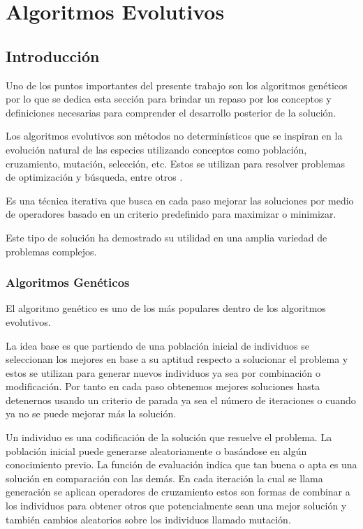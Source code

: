 
\chapter{Algoritmos Evolutivos}

\section{Introducción}

Uno de los puntos importantes del presente trabajo son los algoritmos genéticos por lo que se dedica esta sección para  brindar un repaso por los conceptos y definiciones necesarias para comprender el desarrollo posterior de la solución.

Los algoritmos evolutivos son métodos no determinísticos que se inspiran en la evolución natural de las especies utilizando conceptos como población, cruzamiento, mutación, selección, etc. Estos se utilizan para resolver problemas de optimización y búsqueda, entre otros \citep{Nesmachnow2002}.

Es una técnica iterativa que busca en cada paso mejorar las soluciones por medio de operadores basado en un criterio predefinido para maximizar o minimizar.

Este tipo de solución ha demostrado su utilidad en una amplia variedad de problemas complejos.


\subsection{Algoritmos Genéticos}
El algoritmo genético es uno de los más populares dentro de los algoritmos evolutivos.

La idea base es que partiendo de una población inicial de individuos se seleccionan los mejores en base a su aptitud respecto a solucionar el problema y estos se utilizan para generar nuevos individuos ya sea por combinación o modificación. Por tanto en cada paso obtenemos mejores soluciones hasta detenernos usando un criterio de parada ya sea el número de iteraciones o cuando ya no se puede mejorar más la solución.

Un individuo es una codificación de la solución que resuelve el problema.
La población inicial puede generarse aleatoriamente o basándose en algún conocimiento previo.
La función de evaluación indica que tan buena o apta es una solución en comparación con las demás.
En cada iteración la cual se llama generación se aplican operadores de cruzamiento estos son formas de combinar a los individuos para obtener otros que potencialmente sean una mejor solución y también cambios aleatorios sobre los individuos llamado mutación.

